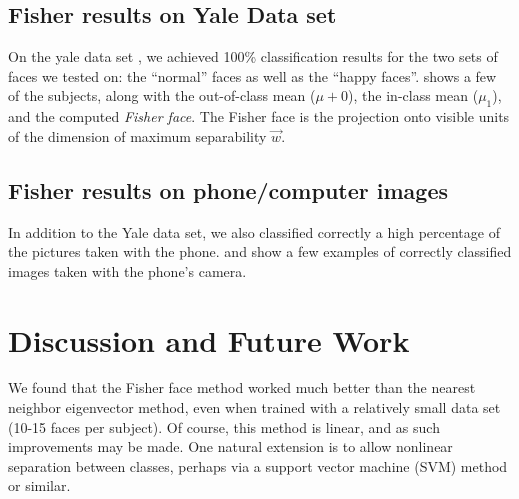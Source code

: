 \subsection{Fisher results on Yale Data set}

On the yale data set \cite{YaleFace}, we achieved 100\% classification
results for the two sets of faces we tested on: the ``normal'' faces
as well as the ``happy faces''.   shows a
few of the subjects, along with the out-of-class mean ($\mu+0$), the
in-class mean ($\mu_1$), and the computed \emph{Fisher face}.  The
Fisher face is the projection onto visible units of the dimension of
maximum separability $\vec w$.




\subsection{Fisher results on phone/computer images}

In addition to the Yale data set, we also classified correctly a high
percentage of the pictures taken with the phone.
 and
 show a few examples of correctly
classified images taken with the phone's camera.





\section{Discussion and Future Work}

We found that the Fisher face method worked much better than the
nearest neighbor eigenvector method, even when trained with a
relatively small data set (10-15 faces per subject).  Of course, this
method is linear, and as such improvements may be made.  One natural
extension is to allow nonlinear separation between classes, perhaps
via a support vector machine (SVM) method or similar.

